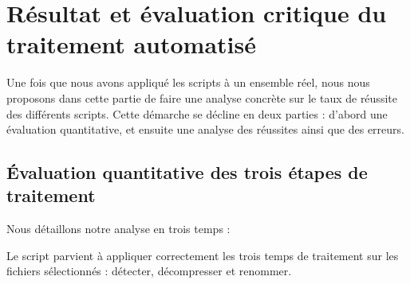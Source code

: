 \section{Résultat et évaluation critique du traitement automatisé}

Une fois que nous avons appliqué les scripts à un ensemble réel, nous nous proposons dans cette partie de faire une analyse concrète sur le taux de réussite des différents scripts. Cette démarche se décline en deux parties : d'abord une évaluation quantitative, et ensuite une analyse des réussites ainsi que des erreurs.

\subsection*{Évaluation quantitative des trois étapes de traitement}

Nous détaillons notre analyse en trois temps :

\begin{table}[H]
	\centering
	\renewcommand{\arraystretch}{1.5}
	\setlength{\tabcolsep}{10pt}
	\caption{Résultats de l'étape 1 -- décompression}
	\label{tab:etape1_decompression}
\end{table}


Le script parvient à appliquer correctement les trois temps de traitement sur les fichiers sélectionnés : détecter, décompresser et renommer.

